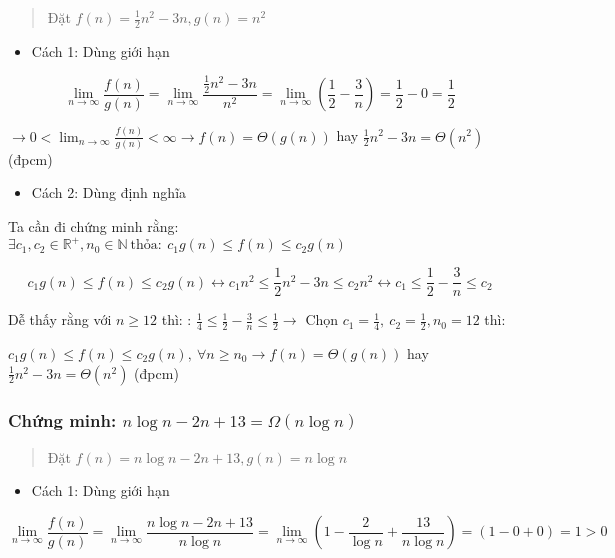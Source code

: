 \begin{quote}
Đặt \(f(n) = \frac{1}{2}n^{2} - 3n,g(n) = n^{2}\)
\end{quote}

\begin{itemize}
\item
  Cách 1: Dùng giới hạn
\end{itemize}

\[\lim_{n \rightarrow \infty}{\frac{f(n)}{g(n)} = \lim_{n \rightarrow \infty}\frac{\frac{1}{2}n^{2} - 3n}{n^{2}} = \lim_{n \to \infty}\left(\frac{1}{2} - \frac{3}{n}\right) = \frac{1}{2} - 0 = \frac{1}{2}}\]

\(\rightarrow 0 < \lim_{n \rightarrow \infty}\frac{f(n)}{g(n)} < \infty \rightarrow f(n) = \Theta(g(n))\)
hay \(\frac{1}{2}n^{2} - 3n = \Theta(n^{2})\) (đpcm)

\begin{itemize}
\item
  Cách 2: Dùng định nghĩa
\end{itemize}

Ta cần đi chứng minh rằng:
\(\exists c_{1},c_{2} \in \mathbb{R}^{+}, n_{0} \in \mathbb{N}\ \text{thỏa}:\ c_{1}g(n) \leq f(n) \leq c_{2}g(n)\)

\[c_{1}g(n) \leq f(n) \leq c_{2}g(n) \leftrightarrow c_{1}n^{2} \leq \frac{1}{2}n^{2} - 3n \leq c_{2}n^{2} \leftrightarrow c_{1} \leq \frac{1}{2} - \frac{3}{n} \leq c_{2}\]

Dễ thấy rằng với \(n \geq 12\) thì: :
\(\frac{1}{4} \leq \frac{1}{2} - \frac{3}{n} \leq \frac{1}{2} \rightarrow\)
Chọn \(c_{1} = \frac{1}{4},\ c_{2} = \frac{1}{2},n_{0} = 12\) thì:

\(c_{1}g(n) \leq f(n) \leq c_{2}g(n),\ \forall n \geq n_{0} \rightarrow f(n) = \Theta(g(n))\)
hay \(\frac{1}{2}n^{2} - 3n = \Theta(n^{2})\) (đpcm)

\subsubsection{\textbf{Chứng minh:}
  \(n\log n - 2n + 13 = \Omega(n\log n)\)}
\begin{quote}
Đặt \(f(n) = n\log n - 2n + 13,g(n) = n\log n\)
\end{quote}

\begin{itemize}
\item
  Cách 1: Dùng giới hạn
\end{itemize}
\[\lim_{n \rightarrow \infty}\frac{f(n)}{g(n)} = \lim_{n \rightarrow \infty}\frac{n\log n - 2n + 13}{n\log n} = \lim_{n \rightarrow \infty}\left(1 - \frac{2}{\log n} + \frac{13}{n\log n}\right) = (1 - 0 + 0) = 1 > 0\]

